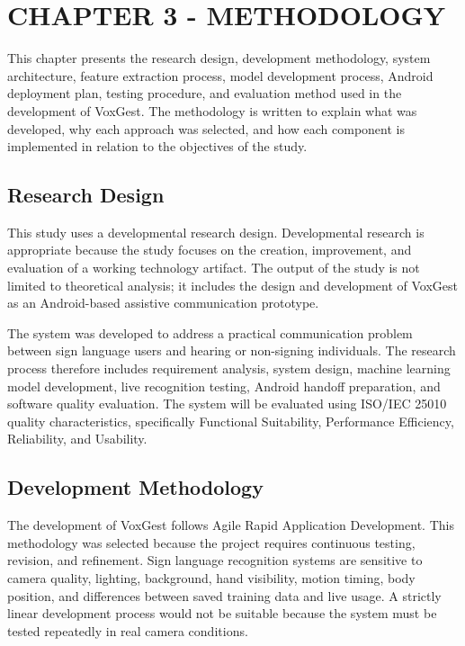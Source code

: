 
\chapter{\uppercase {\textbf{Chapter 3 - Methodology}}}

This chapter presents the research design, development methodology, system architecture, feature extraction process, model development process, Android deployment plan, testing procedure, and evaluation method used in the development of VoxGest. The methodology is written to explain what was developed, why each approach was selected, and how each component is implemented in relation to the objectives of the study.

\section{Research Design}

This study uses a developmental research design. Developmental research is appropriate because the study focuses on the creation, improvement, and evaluation of a working technology artifact. The output of the study is not limited to theoretical analysis; it includes the design and development of VoxGest as an Android-based assistive communication prototype.

The system was developed to address a practical communication problem between sign language users and hearing or non-signing individuals. The research process therefore includes requirement analysis, system design, machine learning model development, live recognition testing, Android handoff preparation, and software quality evaluation. The system will be evaluated using ISO/IEC 25010 quality characteristics, specifically Functional Suitability, Performance Efficiency, Reliability, and Usability.

\section{Development Methodology}

The development of VoxGest follows Agile Rapid Application Development. This methodology was selected because the project requires continuous testing, revision, and refinement. Sign language recognition systems are sensitive to camera quality, lighting, background, hand visibility, motion timing, body position, and differences between saved training data and live usage. A strictly linear development process would not be suitable because the system must be tested repeatedly in real camera conditions.

